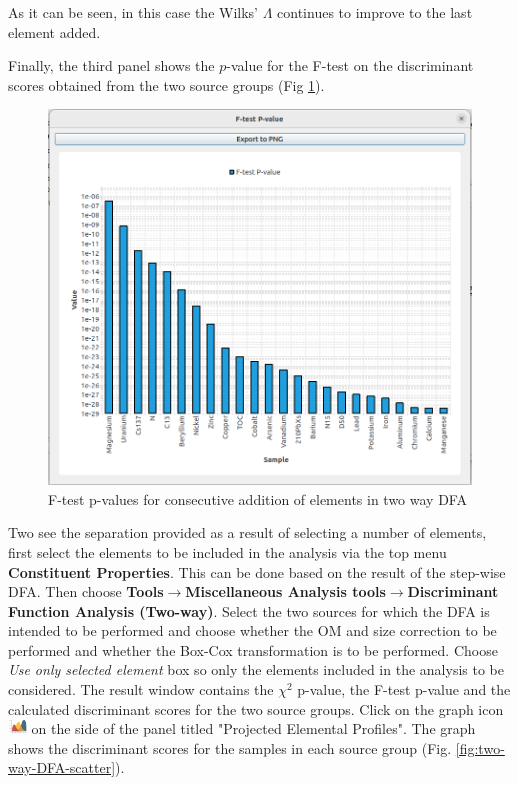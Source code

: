 \documentclass[12pt]{report}
\begin{document}
As it can be seen, in this case the Wilks' $\Lambda$ continues to improve to the last element added. 

Finally, the third panel shows the $p$-value for the F-test on the discriminant scores obtained from the two source groups (Fig \ref{fig:two-way-F-test-P-value}). 

\begin{figure}[ht]
    \centering
    \includegraphics[width=14cm]{Figures/F-test_P_value_two_way_DFA.png}
    \caption{F-test p-values for consecutive addition of elements in two way DFA}
    \label{fig:two-way-F-test-P-value}
\end{figure}
\FloatBarrier

Two see the separation provided as a result of selecting a number of elements, first select the elements to be included in the analysis via the top menu \textbf{Constituent Properties}. This can be done based on the result of the step-wise DFA. Then choose \textbf{Tools}$\rightarrow$\textbf{Miscellaneous Analysis tools}$\rightarrow$\textbf{Discriminant Function Analysis (Two-way)}. Select the two sources for which the DFA is intended to be performed and choose whether the OM and size correction to be performed and whether the Box-Cox transformation is to be performed.  Choose \textit{Use only selected element} box so only the elements included in the analysis to be considered. The result window contains the $\chi^2$ p-value, the F-test p-value and the calculated discriminant scores for the two source groups. Click on the graph icon \includegraphics[width=0.5cm]{Figures/Graph.png} on the side of the panel titled "Projected Elemental Profiles". The graph shows the discriminant scores for the samples in each source group (Fig. \ref{fig:two-way-DFA-scatter}). 
\end{document}
